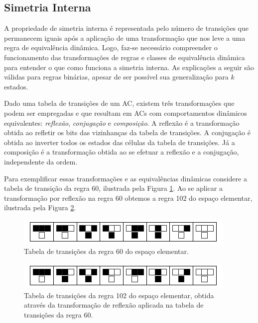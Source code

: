\documentclass[12pt, a4paper]{article}
\begin{document}
\subsection{Simetria Interna}
A propriedade de simetria interna é representada pelo número de transições que permanecem iguais após a aplicação de uma transformação que nos leve a uma regra de equivalência dinâmica. Logo, faz-se necessário compreender o funcionamento das transformações de regras e classes de equivalência dinâmica para entender o que como funciona a simetria interna. As explicações a seguir são válidas para regras binárias, apesar de ser possível sua generalização para $k$ estados.

Dado uma tabela de transições de um AC, existem três transformações que podem ser empregadas e que resultam em ACs com comportamentos dinâmicos equivalentes: \textit{reflexão}, \textit{conjugação} e \textit{composição}. A reflexão é a transformação obtida ao refletir os bits das vizinhanças da tabela de transições. A conjugação é obtida ao inverter todos os estados das células da tabela de transições. Já a composição é a transformação obtida ao se efetuar a reflexão e a conjugação, independente da ordem.

Para exemplificar essas transformações e as equivalências dinâmicas considere a tabela de transição da regra 60, ilustrada pela Figura \ref{fig:table60}. Ao se aplicar a transformação por reflexão na regra 60 obtemos a regra 102 do espaço elementar, ilustrada pela Figura \ref{fig:table102}.

	\begin{figure}[h!]
	  \centering
	  \includegraphics[width=.5\textwidth]{fig_ruleIcon60.png}
	  \caption{Tabela de transições da regra 60 do espaço elementar.}
	  \label{fig:table60}
	\end{figure}

	\begin{figure}[h!]
	  \centering
	  \includegraphics[width=.5\textwidth]{fig_ruleIcon102.png}
	  \caption{Tabela de transições da regra 102 do espaço elementar, obtida através da transformação de reflexão aplicada na tabela de transições da regra 60.}
	  \label{fig:table102}
	\end{figure}
\end{document}

